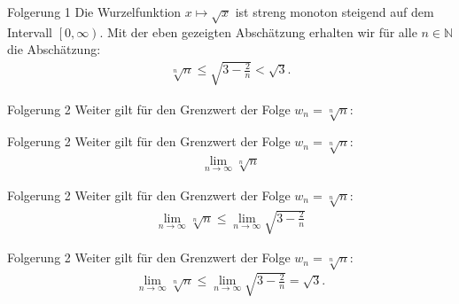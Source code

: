 \documentclass[10pt]{beamer}
\def\bN{\mathbb{N}}
\begin{document}
\begin{frame}{Folgerung 1}
    Die Wurzelfunktion \( x \mapsto \sqrt{x} \) ist streng monoton steigend auf dem Intervall \( \left[0, \infty \right) \). Mit der eben gezeigten Abschätzung erhalten wir für alle \( n \in \bN \) die Abschätzung:
    \begin{align*}
        \sqrt[n]{n}
        \leq \sqrt{3 - \frac{2}{n}}
        < \sqrt{3}.
    \end{align*}
\end{frame}



\begin{frame}{Folgerung 2}
    Weiter gilt für den Grenzwert der Folge \( w_{n} = \sqrt[n]{n} \):
\end{frame}



\begin{frame}{Folgerung 2}
    Weiter gilt für den Grenzwert der Folge \( w_{n} = \sqrt[n]{n} \):
    \begin{align*}
        \lim_{n \to \infty} \sqrt[n]{n}
    \end{align*}
\end{frame}



\begin{frame}{Folgerung 2}
    Weiter gilt für den Grenzwert der Folge \( w_{n} = \sqrt[n]{n} \):
    \begin{align*}
        \lim_{n \to \infty} \sqrt[n]{n}
        \leq \lim_{n \to \infty} \sqrt{3 - \frac{2}{n}}
    \end{align*}
\end{frame}



\begin{frame}{Folgerung 2}
    Weiter gilt für den Grenzwert der Folge \( w_{n} = \sqrt[n]{n} \):
    \begin{align*}
        \lim_{n \to \infty} \sqrt[n]{n}
        \leq \lim_{n \to \infty} \sqrt{3 - \frac{2}{n}}
        = \sqrt{3}.
    \end{align*}
\end{frame}
\end{document}
